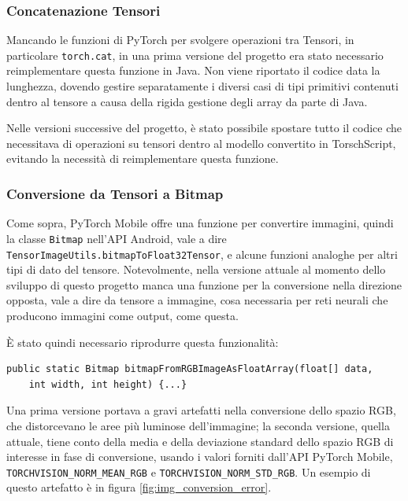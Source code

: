 \subsubsection*{Concatenazione Tensori}

Mancando le funzioni di PyTorch per svolgere operazioni tra Tensori, in particolare
\texttt{torch.cat}, in una prima versione del progetto era stato necessario reimplementare
questa funzione in Java. Non viene riportato il codice data la lunghezza, dovendo gestire 
separatamente i diversi casi di tipi primitivi contenuti dentro al tensore a causa della rigida
gestione degli array da parte di Java.

Nelle versioni successive del progetto, è stato possibile spostare tutto il codice che
necessitava di operazioni su tensori dentro al modello convertito in TorschScript, evitando
la necessità di reimplementare questa funzione.

\subsubsection*{Conversione da Tensori a Bitmap}

Come sopra, PyTorch Mobile offre una funzione per convertire immagini, quindi la classe
\texttt{Bitmap} nell'API Android, vale a dire \texttt{TensorImageUtils.bitmapToFloat32Tensor},
e alcune funzioni analoghe per altri tipi di dato del tensore. Notevolmente, nella versione 
attuale al momento dello sviluppo di questo progetto manca una funzione per la conversione
nella direzione opposta, vale a dire da tensore a immagine, cosa necessaria per reti neurali
che producono immagini come output, come questa.

È stato quindi necessario riprodurre questa funzionalità:

\begin{lstlisting}
public static Bitmap bitmapFromRGBImageAsFloatArray(float[] data, 
    int width, int height) {...}
\end{lstlisting}

Una prima versione portava a gravi artefatti nella conversione dello spazio RGB, che 
distorcevano le aree più luminose dell'immagine; la seconda versione, quella attuale, 
tiene conto della media e della deviazione standard dello spazio RGB di interesse in fase di
conversione, usando i valori forniti dall'API PyTorch Mobile, 
\texttt{TORCHVISION\_NORM\_MEAN\_RGB} e \texttt{TORCHVISION\_NORM\_STD\_RGB}. Un esempio di 
questo artefatto è in figura \ref{fig:img_conversion_error}.

